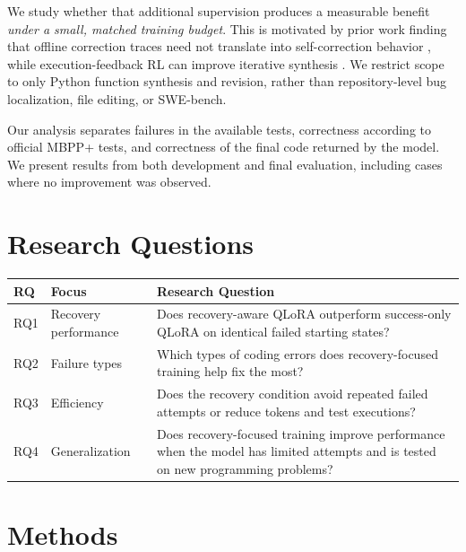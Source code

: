 \documentclass[10pt,twocolumn]{article}
\newcommand{\mbppplus}{MBPP+}
\begin{document}
We study whether that additional supervision produces a measurable benefit \emph{under a small, matched training budget}. This is motivated by prior work finding that offline correction traces need not translate into self-correction behavior \cite{score}, while execution-feedback RL can improve iterative synthesis \cite{rlef}. We restrict scope to only Python function synthesis and revision, rather than repository-level bug localization, file editing, or SWE-bench.

Our analysis separates failures in the available tests, correctness according to official \mbppplus{} tests, and correctness of the final code returned by the model. We present results from both development and final evaluation, including cases where no improvement was observed.

\vspace{-0.25em}
\section{Research Questions}
\par\noindent\begin{minipage}{\columnwidth}
\centering
{}
\label{tab:research_questions}
\footnotesize
\setlength{\tabcolsep}{3pt}
\renewcommand{\arraystretch}{1.15}
\begin{tabular}{@{}p{}p{}p{}@{}}
\toprule
\textbf{RQ} & \textbf{Focus} & \textbf{Research Question} \\
\midrule
RQ1 & Recovery performance & Does recovery-aware QLoRA outperform success-only QLoRA on identical failed starting states? \\
RQ2 & Failure types & Which types of coding errors does recovery-focused training help fix the most? \\
RQ3 & Efficiency & Does the recovery condition avoid repeated failed attempts or reduce tokens and test executions? \\
RQ4 & Generalization & Does recovery-focused training improve performance when the model has limited attempts and is tested on new programming problems? \\
\bottomrule
\end{tabular}
\end{minipage}\par

\section{Methods}
\end{document}
